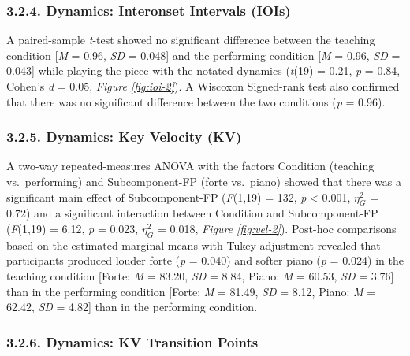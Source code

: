 \documentclass[
  english,
  man,floatsintext]{apa6}
\begin{document}
\hypertarget{dynamics-interonset-intervals-iois-1}{%
\subsubsection{3.2.4. Dynamics: Interonset Intervals (IOIs)}\label{dynamics-interonset-intervals-iois-1}}

A paired-sample \emph{t}-test showed no significant difference between the teaching condition {[}\emph{M} = 0.96, \emph{SD} = 0.048{]} and the performing condition {[}\emph{M} = 0.96, \emph{SD} = 0.043{]} while playing the piece with the notated dynamics (\emph{t}(19) = 0.21, \emph{p} = 0.84, Cohen's \emph{d} = 0.05, \emph{Figure \ref{fig:ioi-2}}). A Wiscoxon Signed-rank test also confirmed that there was no significant difference between the two conditions (\emph{p} = 0.96).

\hypertarget{dynamics-key-velocity-kv-1}{%
\subsubsection{3.2.5. Dynamics: Key Velocity (KV)}\label{dynamics-key-velocity-kv-1}}

A two-way repeated-measures ANOVA with the factors Condition (teaching vs.~performing) and Subcomponent-FP (forte vs.~piano) showed that there was a significant main effect of Subcomponent-FP (\emph{F}(1,19) = 132, \emph{p} \textless{} 0.001, \(\eta_G^2\) = 0.72) and a significant interaction between Condition and Subcomponent-FP (\emph{F}(1,19) = 6.12, \emph{p} = 0.023, \(\eta_G^2\) = 0.018, \emph{Figure \ref{fig:vel-2}}). Post-hoc comparisons based on the estimated marginal means with Tukey adjustment revealed that participants produced louder forte (\emph{p} = 0.040) and softer piano (\emph{p} = 0.024) in the teaching condition {[}Forte: \emph{M} = 83.20, \emph{SD} = 8.84, Piano: \emph{M} = 60.53, \emph{SD} = 3.76{]} than in the performing condition {[}Forte: \emph{M} = 81.49, \emph{SD} = 8.12, Piano: \emph{M} = 62.42, \emph{SD} = 4.82{]} than in the performing condition.

\hypertarget{dynamics-kv-transition-points-1}{%
\subsubsection{3.2.6. Dynamics: KV Transition Points}\label{dynamics-kv-transition-points-1}}
\end{document}
